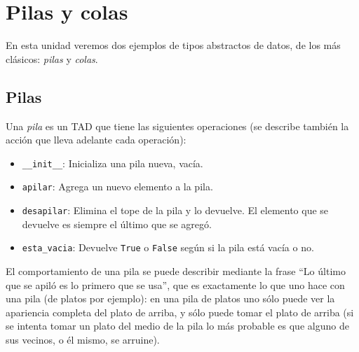 
%

\chapter{Pilas y colas}

En esta unidad veremos dos ejemplos de tipos abstractos de datos, de los más
clásicos: {\it pilas} y {\it colas}.

\section{Pilas}

Una {\it pila} es un TAD que tiene las siguientes operaciones (se describe también la acción que
lleva adelante cada operación):

\begin{itemize}
\item \lstinline+__init__+: Inicializa una pila nueva, vacía.

\item \lstinline!apilar!: Agrega un nuevo elemento a la pila.

\item \lstinline!desapilar!: Elimina el tope de la pila y lo devuelve.
El elemento que se devuelve es siempre el último que se agregó.

\item \lstinline!esta_vacia!: Devuelve \lstinline!True! o \lstinline!False!
según si la pila está vacía o no.

\end{itemize}

El comportamiento de una pila se puede describir mediante la frase
``Lo último que se apiló es lo primero que se usa'', que es exactamente lo que
uno hace con una pila (de platos por ejemplo): en una pila de platos uno sólo
puede ver la apariencia completa del plato de arriba, y sólo puede tomar el
plato de arriba (si se intenta tomar un plato del medio de la pila lo más
probable es que alguno de sus vecinos, o él mismo, se arruine).

